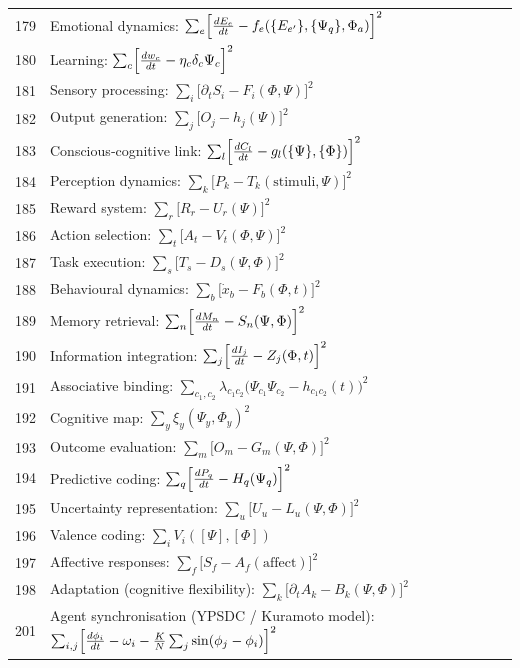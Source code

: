 \documentclass[12pt,a4paper]{article}
\begin{document}
\begin{longtable}{r l}
		179 & Emotional dynamics: $\sum_e\Bigl[\frac{dE_e}{dt} - f_e(\{E_{e'}\},\{\Psi_q\},\Phi_a)\Bigr]^2$ \\
		180 & Learning: $\sum_c\Bigl[\frac{dw_c}{dt} - \eta_c\delta_c\Psi_c\Bigr]^2$ \\
		181 & Sensory processing: $\sum_i\bigl[\partial_t S_i - F_i(\Phi,\Psi)\bigr]^2$ \\
		182 & Output generation: $\sum_j\bigl[O_j - h_j(\Psi)\bigr]^2$ \\
		183 & Conscious‑cognitive link: $\sum_l\Bigl[\frac{dC_l}{dt} - g_l(\{\Psi\},\{\Phi\})\Bigr]^2$ \\
		184 & Perception dynamics: $\sum_k\bigl[P_k - T_k(\text{stimuli},\Psi)\bigr]^2$ \\
		185 & Reward system: $\sum_r\bigl[R_r - U_r(\Psi)\bigr]^2$ \\
		186 & Action selection: $\sum_t\bigl[A_t - V_t(\Phi,\Psi)\bigr]^2$ \\
		187 & Task execution: $\sum_s\bigl[T_s - D_s(\Psi,\Phi)\bigr]^2$ \\
		188 & Behavioural dynamics: $\sum_b\bigl[\dot x_b - F_b(\Phi,t)\bigr]^2$ \\
		189 & Memory retrieval: $\sum_n\Bigl[\frac{dM_n}{dt} - S_n(\Psi,\Phi)\Bigr]^2$ \\
		190 & Information integration: $\sum_j\Bigl[\frac{dI_j}{dt} - Z_j(\Phi,t)\Bigr]^2$ \\
		191 & Associative binding: $\sum_{c_1,c_2}\lambda_{c_1c_2}\bigl(\Psi_{c_1}\Psi_{c_2} - h_{c_1c_2}(t)\bigr)^2$ \\
		192 & Cognitive map: $\sum_y\xi_y(\Psi_y,\Phi_y)^2$ \\
		193 & Outcome evaluation: $\sum_m\bigl[O_m - G_m(\Psi,\Phi)\bigr]^2$ \\
		194 & Predictive coding: $\sum_q\Bigl[\frac{dP_q}{dt} - H_q(\Psi_q)\Bigr]^2$ \\
		195 & Uncertainty representation: $\sum_u\bigl[U_u - L_u(\Psi,\Phi)\bigr]^2$ \\
		196 & Valence coding: $\sum_i V_i([\Psi],[\Phi])$ \\
		197 & Affective responses: $\sum_f\bigl[S_f - A_f(\text{affect})\bigr]^2$ \\
		198 & Adaptation (cognitive flexibility): $\sum_k\bigl[\partial_t A_k - B_k(\Psi,\Phi)\bigr]^2$ \\
		201 & Agent synchronisation (YPSDC / Kuramoto model): $\sum_{i,j}\Bigl[\frac{d\phi_i}{dt} - \omega_i - \frac{K}{N}\sum_j\sin(\phi_j-\phi_i)\Bigr]^2$ \\

\end{longtable}
\end{document}
